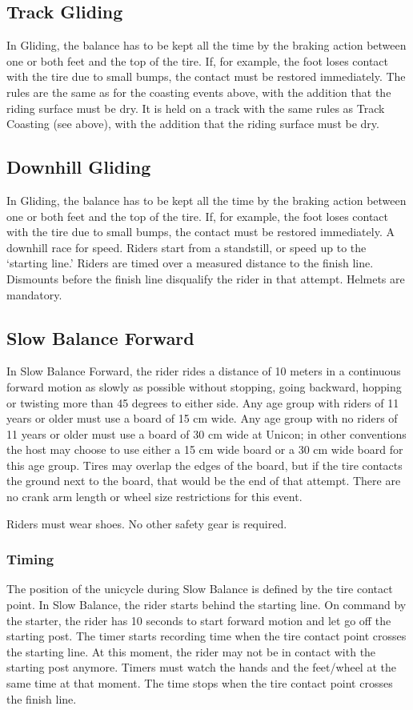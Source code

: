 \subsection{Track Gliding}

In Gliding, the balance has to be kept all the time by the braking action between one or both feet and the top of the tire.
If, for example, the foot loses contact with the tire due to small bumps, the contact must be restored immediately.
The rules are the same as for the coasting events above, with the addition that the riding surface must be dry.
It is held on a track with the same rules as Track Coasting (see above), with the addition that the riding surface must be dry.

\subsection{Downhill Gliding}
In Gliding, the balance has to be kept all the time by the braking action between one or both feet and the top of the tire.
If, for example, the foot loses contact with the tire due to small bumps, the contact must be restored immediately.
A downhill race for speed.
Riders start from a standstill, or speed up to the `starting line.'
Riders are timed over a measured distance to the finish line.
Dismounts before the finish line disqualify the rider in that attempt.
Helmets are mandatory.

\subsection{Slow Balance Forward}

In Slow Balance Forward, the rider rides a distance of 10 meters in a continuous forward motion as slowly as possible without stopping, going backward, hopping or twisting more than 45 degrees to either side.
Any age group with riders of 11 years or older must use a board of 15 cm wide.
Any age group with no riders of 11 years or older must use a board of 30 cm wide at Unicon; in other conventions the host may choose to use either a 15 cm wide board or a 30 cm wide board for this age group.
Tires may overlap the edges of the board, but if the tire contacts the ground next to the board, that would be the end of that attempt.
There are no crank arm length or wheel size restrictions for this event.

Riders must wear shoes.
No other safety gear is required.

\subsubsection{Timing}
The position of the unicycle during Slow Balance is defined by the tire contact point.
In Slow Balance, the rider starts behind the starting line.
On command by the starter, the rider has 10 seconds to start forward motion and let go off the starting post.
The timer starts recording time when the tire contact point crosses the starting line.
At this moment, the rider may not be in contact with the starting post anymore.
Timers must watch the hands and the feet/wheel at the same time at that moment.
The time stops when the tire contact point crosses the finish line.

